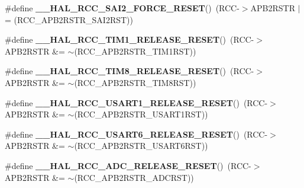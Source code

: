 \begin{DoxyCompactItemize}
\#define {\bfseries \+\_\+\+\_\+\+H\+A\+L\+\_\+\+R\+C\+C\+\_\+\+S\+A\+I2\+\_\+\+F\+O\+R\+C\+E\+\_\+\+R\+E\+S\+ET}()~(R\+CC-\/$>$A\+P\+B2\+R\+S\+TR $\vert$= (R\+C\+C\+\_\+\+A\+P\+B2\+R\+S\+T\+R\+\_\+\+S\+A\+I2\+R\+ST))
\item 
\mbox{\label{group___r_c_c_ex___force___release___peripheral___reset_ga1857f223177c9548ce1bae9753e0a7b4}} 
\#define {\bfseries \+\_\+\+\_\+\+H\+A\+L\+\_\+\+R\+C\+C\+\_\+\+T\+I\+M1\+\_\+\+R\+E\+L\+E\+A\+S\+E\+\_\+\+R\+E\+S\+ET}()~(R\+CC-\/$>$A\+P\+B2\+R\+S\+TR \&= $\sim$(R\+C\+C\+\_\+\+A\+P\+B2\+R\+S\+T\+R\+\_\+\+T\+I\+M1\+R\+ST))
\item 
\mbox{\label{group___r_c_c_ex___force___release___peripheral___reset_ga1eb65ddc0b32886b140d71e252dc4727}} 
\#define {\bfseries \+\_\+\+\_\+\+H\+A\+L\+\_\+\+R\+C\+C\+\_\+\+T\+I\+M8\+\_\+\+R\+E\+L\+E\+A\+S\+E\+\_\+\+R\+E\+S\+ET}()~(R\+CC-\/$>$A\+P\+B2\+R\+S\+TR \&= $\sim$(R\+C\+C\+\_\+\+A\+P\+B2\+R\+S\+T\+R\+\_\+\+T\+I\+M8\+R\+ST))
\item 
\mbox{\label{group___r_c_c_ex___force___release___peripheral___reset_ga243061674e38d05d222697046d43813a}} 
\#define {\bfseries \+\_\+\+\_\+\+H\+A\+L\+\_\+\+R\+C\+C\+\_\+\+U\+S\+A\+R\+T1\+\_\+\+R\+E\+L\+E\+A\+S\+E\+\_\+\+R\+E\+S\+ET}()~(R\+CC-\/$>$A\+P\+B2\+R\+S\+TR \&= $\sim$(R\+C\+C\+\_\+\+A\+P\+B2\+R\+S\+T\+R\+\_\+\+U\+S\+A\+R\+T1\+R\+ST))
\item 
\mbox{\label{group___r_c_c_ex___force___release___peripheral___reset_ga6b60ae1fd712732bea57de27f79a20d3}} 
\#define {\bfseries \+\_\+\+\_\+\+H\+A\+L\+\_\+\+R\+C\+C\+\_\+\+U\+S\+A\+R\+T6\+\_\+\+R\+E\+L\+E\+A\+S\+E\+\_\+\+R\+E\+S\+ET}()~(R\+CC-\/$>$A\+P\+B2\+R\+S\+TR \&= $\sim$(R\+C\+C\+\_\+\+A\+P\+B2\+R\+S\+T\+R\+\_\+\+U\+S\+A\+R\+T6\+R\+ST))
\item 
\mbox{\label{group___r_c_c_ex___force___release___peripheral___reset_ga06411259bd987c32186d5851815cbd59}} 
\#define {\bfseries \+\_\+\+\_\+\+H\+A\+L\+\_\+\+R\+C\+C\+\_\+\+A\+D\+C\+\_\+\+R\+E\+L\+E\+A\+S\+E\+\_\+\+R\+E\+S\+ET}()~(R\+CC-\/$>$A\+P\+B2\+R\+S\+TR \&= $\sim$(R\+C\+C\+\_\+\+A\+P\+B2\+R\+S\+T\+R\+\_\+\+A\+D\+C\+R\+ST))

\end{DoxyCompactItemize}
